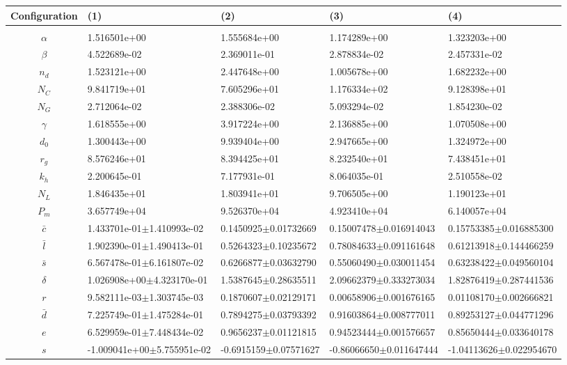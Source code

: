 \begin{center}

\begin{tabular}{|c|p{3.7cm}|p{3.7cm}|p{3.7cm}|p{3.7cm}|}
Configuration&(1)&(2)&(3)&(4)\\\hline
&&&&\\
$\alpha$&1.516501e+00&1.555684e+00&1.174289e+00&1.323203e+00\\
$\beta$&4.522689e-02&2.369011e-01&2.878834e-02&2.457331e-02\\
$n_d$&1.523121e+00&2.447648e+00&1.005678e+00&1.682232e+00\\
$N_C$&9.841719e+01&7.605296e+01&1.176334e+02&9.128398e+01\\
$N_G$&2.712064e-02&2.388306e-02&5.093294e-02&1.854230e-02\\
$\gamma$&1.618555e+00&3.917224e+00&2.136885e+00&1.070508e+00\\
$d_0$&1.300443e+00&9.939404e+00&2.947665e+00&1.324972e+00\\
$r_g$&8.576246e+01&8.394425e+01&8.232540e+01&7.438451e+01\\
$k_h$&2.200645e-01&7.177931e-01&8.064035e-01&2.510558e-02\\
$N_L$&1.846435e+01&1.803941e+01&9.706505e+00&1.190123e+01\\
$P_m$&3.657749e+04&9.526370e+04&4.923410e+04&6.140057e+04\\
$\bar{c}$&1.433701e-01$\pm$1.410993e-02&0.1450925$\pm$0.01732669&0.15007478$\pm$0.016914043&0.15753385$\pm$0.016885300\\
$\bar{l}$&1.902390e-01$\pm$1.490413e-01&0.5264323$\pm$0.10235672&0.78084633$\pm$0.091161648&0.61213918$\pm$0.144466259\\
$\bar{s}$&6.567478e-01$\pm$6.161807e-02&0.6266877$\pm$0.03632790&0.55060490$\pm$0.030011454&0.63238422$\pm$0.049560104\\
$\delta$&1.026908e+00$\pm$4.323170e-01&1.5387645$\pm$0.28635511&2.09662379$\pm$0.333273034&1.82876419$\pm$0.287441536\\
$r$&9.582111e-03$\pm$1.303745e-03&0.1870607$\pm$0.02129171&0.00658906$\pm$0.001676165&0.01108170$\pm$0.002666821\\
$\bar{d}$&7.225749e-01$\pm$1.475284e-01&0.7894275$\pm$0.03793392&0.91603864$\pm$0.008777011&0.89253127$\pm$0.044771296\\
$e$&6.529959e-01$\pm$7.448434e-02&0.9656237$\pm$0.01121815&0.94523444$\pm$0.001576657&0.85650444$\pm$0.033640178\\
$s$&-1.009041e+00$\pm$5.755951e-02&-0.6915159$\pm$0.07571627&-0.86066650$\pm$0.011647444&-1.04113626$\pm$0.022954670\\

\end{tabular}
\end{center}

